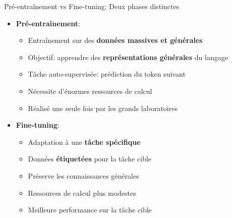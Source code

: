 \documentclass[aspectratio=169]{beamer}
\begin{document}
\begin{frame}{Pré-entraînement vs Fine-tuning: Deux phases distinctes}
    \begin{itemize}
        \item \textbf{Pré-entraînement}:
        \begin{itemize}
            \item Entraînement sur des \textbf{données massives et générales}
            \item Objectif: apprendre des \textbf{représentations générales} du langage
            \item Tâche auto-supervisée: prédiction du token suivant
            \item Nécessite d'énormes ressources de calcul
            \item Réalisé une seule fois par les grands laboratoires
        \end{itemize}
        \vspace{0.3cm}
        \item \textbf{Fine-tuning}:
        \begin{itemize}
            \item Adaptation à une \textbf{tâche spécifique}
            \item Données \textbf{étiquetées} pour la tâche cible
            \item Préserve les connaissances générales
            \item Ressources de calcul plus modestes
            \item Meilleure performance sur la tâche cible
        \end{itemize}
    \end{itemize}
\end{frame}
\end{document}
